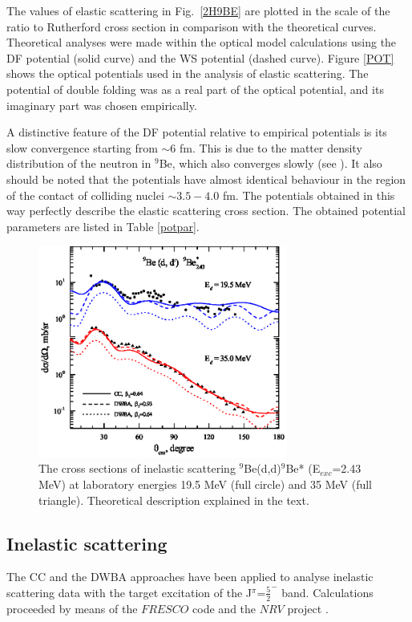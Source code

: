 \documentclass[10pt]{iopart}
\begin{document}
The values of elastic scattering in Fig.~\ref{2H9BE} are plotted in the scale of the ratio to Rutherford cross
section in comparison with the theoretical curves. Theoretical analyses were made within the optical model calculations using the DF potential (solid curve) and the WS potential (dashed curve).  Figure \ref{POT} shows the optical potentials used in the analysis of elastic scattering. The potential of double folding was as a real part of the optical potential, and its imaginary part was chosen empirically. 

A distinctive feature of the DF potential relative to empirical potentials is its slow convergence starting from $\sim 6$ fm. This is due to the matter density distribution of the neutron in $^9$Be, which also converges slowly (see \cite{urazbekov2016}). It also should  be noted that the potentials have almost identical behaviour in the region of the contact of colliding nuclei $\sim3.5-4.0$ fm. 
The potentials obtained in this way perfectly describe the elastic scattering cross section. The obtained potential parameters  are listed in Table \ref{potpar}.  


\begin{figure}[tp]
\centering
\includegraphics[width=8.2cm]{2H9BE2430MEV.eps}

\caption{\label{2H9BE2430MEV}The cross sections of inelastic scattering $^9$Be(d,d)$^9$Be* (E$_{exc}$=2.43 MeV) at laboratory energies 19.5 MeV (full circle) and 35 MeV (full triangle). Theoretical description explained in the text.}
\end{figure}

\subsection{Inelastic scattering}
The CC and the DWBA approaches have been applied to  analyse  inelastic scattering data with the target excitation of the  J$^{\pi}$=$\frac{5}{2}^-$ band. Calculations proceeded by means of the $FRESCO$ code \cite{fresco} and the $NRV$ project \cite{nrv}.
\end{document}
